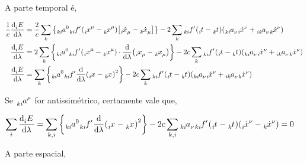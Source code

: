 \documentclass[twoside]{amsart}
\numberwithin{equation}{section}
\begin{document}
A parte temporal é,

\begin{align}
    \frac1c\dv{\tensor[_i]{E}{}}{\lambda}&=\frac2c\sum\limits_{k}\qty{\tensor[_{ki}]{a}{^0}\tensor[_{ki}]{{f'}}{}\qty(\tensor[_i]{x}{^\mu}-\tensor[_k]{x}{^\mu})\qty[\tensor[_i]{\dot{x}}{_\mu}-\tensor[_k]{\dot{x}}{_\mu}]}-2\sum\limits_k \tensor[_{ki}]{{f'}}{}\qty(\tensor[_i]{t}{}-\tensor[_k]{t}{})\qty(\tensor[_{ki}]{a}{_\nu}\tensor[_i]{\dot{x}}{^\nu}+\tensor[_{ik}]{a}{_\nu}\tensor[_k]{\dot{x}}{^\nu})\\
    \dv{\tensor[_i]{E}{}}{\lambda}&=2\sum\limits_{k}\qty{\tensor[_{ki}]{a}{^0}\tensor[_{ki}]{{f'}}{}\qty(\tensor[_i]{x}{^\mu}-\tensor[_k]{x}{^\mu})\cdot\dv{}{\lambda}\qty(\tensor[_i]{x}{_\mu}-\tensor[_k]{x}{_\mu})}-2c\sum\limits_k \tensor[_{ki}]{{f'}}{}\qty(\tensor[_i]{t}{}-\tensor[_k]{t}{})\qty(\tensor[_{ki}]{a}{_\nu}\tensor[_i]{\dot{x}}{^\nu}+\tensor[_{ik}]{a}{_\nu}\tensor[_k]{\dot{x}}{^\nu})\\
    \dv{\tensor[_i]{E}{}}{\lambda}&=\sum\limits_{k}\qty{\tensor[_{ki}]{a}{^0}\tensor[_{ki}]{{f'}}{}\dv{}{\lambda}\qty(\tensor[_i]{x}{}-\tensor[_k]{x}{})^2}-2c\sum\limits_k \tensor[_{ki}]{{f'}}{}\qty(\tensor[_i]{t}{}-\tensor[_k]{t}{})\qty(\tensor[_{ki}]{a}{_\nu}\tensor[_i]{\dot{x}}{^\nu}+\tensor[_{ik}]{a}{_\nu}\tensor[_k]{\dot{x}}{^\nu})
\end{align}

Se $\tensor[_{ki}]{a}{^\mu}$ for antissimétrico, certamente vale que,

\begin{align}
    \sum\limits_i\dv{\tensor[_i]{E}{}}{\lambda}&=\sum\limits_{k,i}\qty{\tensor[_{ki}]{a}{^0}\tensor[_{ki}]{{f'}}{}\dv{}{\lambda}\qty(\tensor[_i]{x}{}-\tensor[_k]{x}{})^2}-2c\sum\limits_{k,i}\tensor[_{ki}]{a}{_\nu} \tensor[_{ki}]{{f'}}{}\qty(\tensor[_i]{t}{}-\tensor[_k]{t}{})\qty(\tensor[_i]{\dot{x}}{^\nu}-\tensor[_k]{\dot{x}}{^\nu})=0
\end{align}

A parte espacial,
\end{document}
